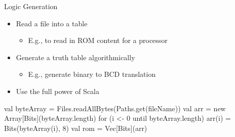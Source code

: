 \documentclass[xcolor=pdflatex,dvipsnames,table]{beamer}
\begin{document}
\begin{frame}[fragile]{Logic Generation}
\begin{itemize}
\item Read a file into a table
\begin{itemize}
\item E.g., to read in ROM content for a processor
\end{itemize}
\item Generate a truth table algorithmically
\begin{itemize}
\item E.g., generate binary to BCD translation
\end{itemize}
\item Use the full power of Scala
\end{itemize}
\begin{chisel}
val byteArray = Files.readAllBytes(Paths.get(fileName))
val arr = new Array[Bits](byteArray.length)
for (i <- 0 until byteArray.length) {
  arr(i) = Bits(byteArray(i), 8)
}
val rom = Vec[Bits](arr)
\end{chisel}
\end{frame}
\end{document}
